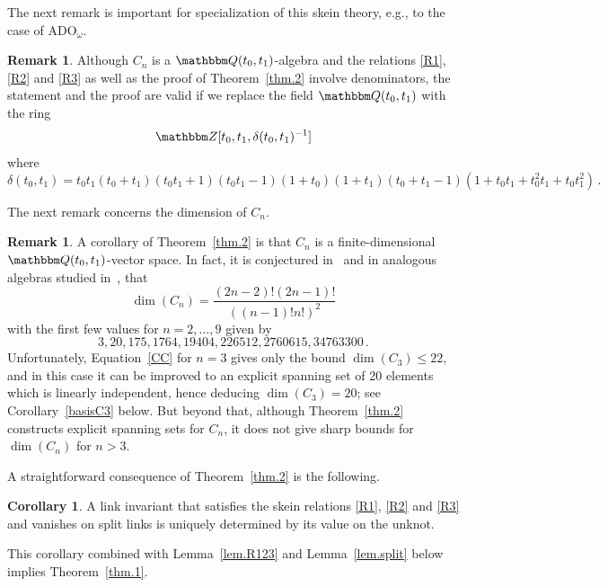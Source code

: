 \documentclass[12pt,reqno]{amsart}
\theoremstyle{definition}
\newtheorem{remark}[theorem]{Remark}
\newtheorem{corollary}[theorem]{Corollary}
\def\BZ{\mathbbm Z}
\def\BQ{\mathbbm Q}
\def\be{\begin{equation}}
\def\ee{\end{equation}}
\def\ADO{\mathrm{ADO}}
\begin{document}
The next remark is important for specialization of this skein theory, e.g., to
the case of $\ADO_\omega$.

\begin{remark}
\label{rem.denom}
Although $C_n$ is a $\BQ(t_0,t_1)$-algebra and the relations \eqref{R1}, \eqref{R2}
and \eqref{R3}
as well as the proof of Theorem~\ref{thm.2} involve denominators, the statement
and the proof are valid if we replace the field $\BQ(t_0,t_1)$ with the ring
\be
\BZ[t_0,t_1, \delta(t_0,t_1)^{-1}]
\ee
where
\be
\delta(t_0,t_1) = t_0 t_1 (t_0 + t_1)(t_0 t_1 +1)(t_0 t_1 -1)(1+t_0)(1+t_1)
(t_0 + t_1 -1) (1 + t_0 t_1 + t_0^2 t_1 + t_0 t_1^2) \,.
\ee
\end{remark}

The next remark concerns the dimension of $C_n$.

\begin{remark}
\label{rem.dimCn}  
A corollary of Theorem~\ref{thm.2} is that $C_n$ is a finite-dimensional
$\BQ(t_0,t_1)$-vector space. In fact, it is conjectured in~\cite{MW} and
in analogous algebras studied in~\cite{Anghel}, that
\be
\dim(C_n) = \frac{(2 n-2)!(2 n-1)!}{((n-1)!n!)^2}
\ee
with the first few values for $n=2,\dots,9$ given by
\be
3, 20, 175, 1764, 19404, 226512, 2760615, 34763300 \,.
\ee
Unfortunately, Equation~\eqref{CC} for $n=3$ gives only the bound
$\dim(C_3) \leq 22$, and in this case it can be improved to an explicit
spanning set of 20 elements which is linearly independent, hence deducing
$\dim(C_3)=20$; see Corollary~\ref{basisC3} below. But beyond that, although
Theorem~\ref{thm.2} constructs explicit spanning sets for $C_n$, it does not give
sharp bounds for $\dim(C_n)$ for $n>3$.
\end{remark}

A straightforward consequence of Theorem~\ref{thm.2} is the following.

\begin{corollary}
\label{cor.1}  
A link invariant that satisfies the skein relations \eqref{R1}, \eqref{R2}
and \eqref{R3} and vanishes on split links is uniquely
determined by its value on the unknot.
\end{corollary}

This corollary combined with Lemma~\ref{lem.R123} and Lemma~\ref{lem.split}
below implies Theorem~\ref{thm.1}.
\end{document}
